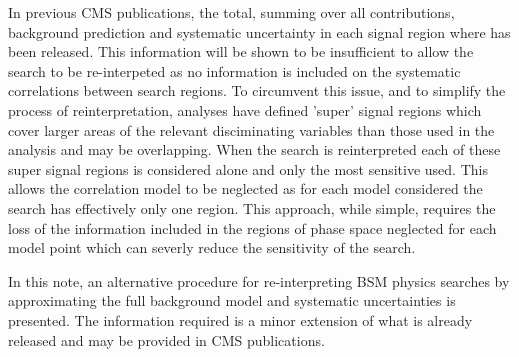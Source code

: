 In previous CMS publications, the total, summing over all contributions, background prediction 
and systematic uncertainty in each signal region where has been released. 
This information will be shown to be insufficient to allow the search to be re-interpeted as no
information is included on the systematic correlations between search regions.
To circumvent this issue, and to simplify the process of reinterpretation, analyses have defined 
'super' signal regions which cover larger areas of the relevant disciminating variables 
than those used in the analysis and may be overlapping. When the search is reinterpreted each of 
these super signal regions is considered alone and only the most sensitive used. This allows 
the correlation model to be neglected as for each model considered the search has effectively only one region.
This approach, while simple, requires the loss of the information included in the regions of phase
space neglected for each model point which can severly reduce the sensitivity of the search. 

In this note, an alternative procedure for re-interpreting BSM physics searches by approximating
the full background model and systematic uncertainties is presented. The information 
required is a minor extension of what is already released and may be provided in CMS publications.




